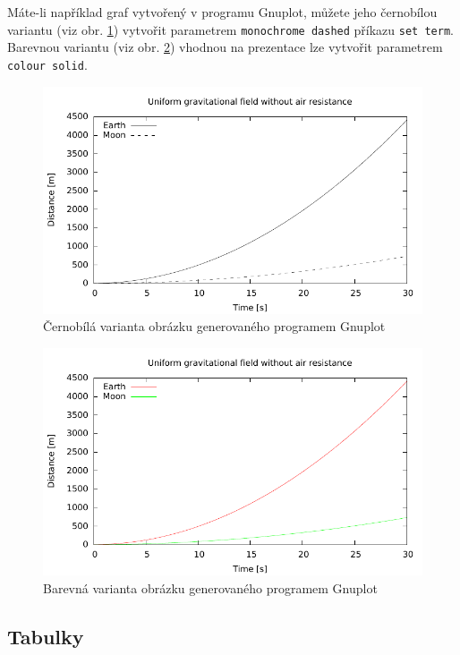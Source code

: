 \documentclass[thesis=B,czech]{FITthesis}[2011/06/14]
\begin{document}
 Máte-li například graf vytvořený v programu Gnuplot, můžete jeho černobílou variantu (viz obr. \ref{fig:gnuplot-bw}) vytvořit parametrem \verb|monochrome dashed| příkazu \verb|set term|. Barevnou variantu (viz obr. \ref{fig:gnuplot-col}) vhodnou na prezentace lze vytvořit parametrem \verb|colour solid|.
 
 \begin{figure}\centering
 	\includegraphics{gnuplot-bw}
 	\caption{Černobílá varianta obrázku generovaného programem Gnuplot}\label{fig:gnuplot-bw}
 \end{figure}
 
 \begin{figure}\centering
 	\includegraphics{gnuplot-col}
 	\caption{Barevná varianta obrázku generovaného programem Gnuplot}\label{fig:gnuplot-col}
 \end{figure}
 
 
 \subsection{Tabulky}
 
\end{document}
